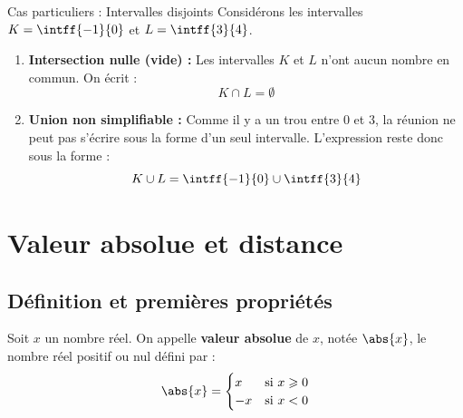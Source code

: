 \begin{ex}{Cas particuliers : Intervalles disjoints}
	Considérons les intervalles $K = \intff{-1}{0}$ et $L = \intff{3}{4}$.

	\begin{center}
	\end{center}

	\begin{enumerate}
		\item \textbf{Intersection nulle (vide) :}
		      Les intervalles $K$ et $L$ n'ont aucun nombre en commun. On écrit :
		      \[
			      K \cap L = \emptyset
		      \]
		\item \textbf{Union non simplifiable :}
		      Comme il y a un \og{}trou\fg{} entre $0$ et $3$, la réunion ne peut pas s'écrire sous la forme d'un seul intervalle. L'expression reste donc sous la forme :
		      \[
			      K \cup L = \intff{-1}{0} \cup \intff{3}{4}
		      \]
	\end{enumerate}
\end{ex}

\section{Valeur absolue et distance}

\subsection{Définition et premières propriétés}

\begin{df}
	Soit $x$ un nombre réel. On appelle \textbf{valeur absolue} de $x$, notée $\abs{x}$, le nombre réel positif ou nul défini par :
	\[
		\abs{x} =
		\begin{cases}
			x  & \text{si } x \geqslant 0 \\
			-x & \text{si } x < 0
		\end{cases}
	\]
\end{df}

